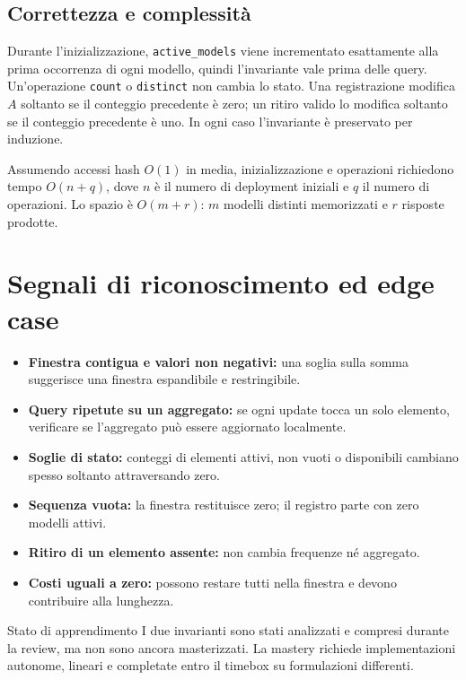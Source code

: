 \subsection{Correttezza e complessità}

Durante l'inizializzazione, \texttt{active\_models} viene incrementato
esattamente alla prima occorrenza di ogni modello, quindi l'invariante vale
prima delle query. Un'operazione \texttt{count} o \texttt{distinct} non cambia
lo stato. Una registrazione modifica $A$ soltanto se il conteggio precedente è
zero; un ritiro valido lo modifica soltanto se il conteggio precedente è uno.
In ogni caso l'invariante è preservato per induzione.

Assumendo accessi hash $O(1)$ in media, inizializzazione e operazioni richiedono
tempo $O(n+q)$, dove $n$ è il numero di deployment iniziali e $q$ il numero di
operazioni. Lo spazio è $O(m+r)$: $m$ modelli distinti memorizzati e $r$
risposte prodotte.

\section{Segnali di riconoscimento ed edge case}

\begin{itemize}
  \item \textbf{Finestra contigua e valori non negativi:} una soglia sulla
        somma suggerisce una finestra espandibile e restringibile.
  \item \textbf{Query ripetute su un aggregato:} se ogni update tocca un solo
        elemento, verificare se l'aggregato può essere aggiornato localmente.
  \item \textbf{Soglie di stato:} conteggi di elementi attivi, non vuoti o
        disponibili cambiano spesso soltanto attraversando zero.
  \item \textbf{Sequenza vuota:} la finestra restituisce zero; il registro
        parte con zero modelli attivi.
  \item \textbf{Ritiro di un elemento assente:} non cambia frequenze né
        aggregato.
  \item \textbf{Costi uguali a zero:} possono restare tutti nella finestra e
        devono contribuire alla lunghezza.
\end{itemize}

\begin{definitionbox}{Stato di apprendimento}
I due invarianti sono stati analizzati e compresi durante la review, ma non
sono ancora masterizzati. La mastery richiede implementazioni autonome,
lineari e completate entro il timebox su formulazioni differenti.
\end{definitionbox}
